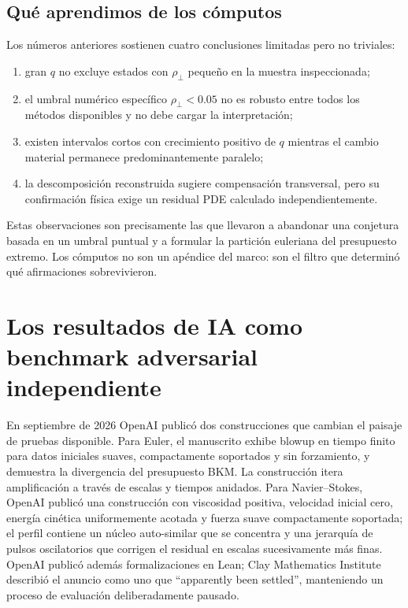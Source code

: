 \documentclass[11pt]{article}
\newcommand{\rhoT}{\rho_{\perp}}
\begin{document}
\subsection{Qué aprendimos de los cómputos}

Los números anteriores sostienen cuatro conclusiones limitadas pero no triviales:
\begin{enumerate}[leftmargin=1.7em]
\item gran $q$ no excluye estados con $\rhoT$ pequeño en la muestra inspeccionada;
\item el umbral numérico específico $\rhoT<0.05$ no es robusto entre todos los métodos disponibles y no debe cargar la interpretación;
\item existen intervalos cortos con crecimiento positivo de $q$ mientras el cambio material permanece predominantemente paralelo;
\item la descomposición reconstruida sugiere compensación transversal, pero su confirmación física exige un residual PDE calculado independientemente.
\end{enumerate}

Estas observaciones son precisamente las que llevaron a abandonar una conjetura basada en un umbral puntual y a formular la partición euleriana del presupuesto extremo. Los cómputos no son un apéndice del marco: son el filtro que determinó qué afirmaciones sobrevivieron.

\section{Los resultados de IA como benchmark adversarial independiente}

En septiembre de 2026 OpenAI publicó dos construcciones que cambian el paisaje de pruebas disponible. Para Euler, el manuscrito exhibe blowup en tiempo finito para datos iniciales suaves, compactamente soportados y sin forzamiento, y demuestra la divergencia del presupuesto BKM. La construcción itera amplificación a través de escalas y tiempos anidados. Para Navier--Stokes, OpenAI publicó una construcción con viscosidad positiva, velocidad inicial cero, energía cinética uniformemente acotada y fuerza suave compactamente soportada; el perfil contiene un núcleo auto-similar que se concentra y una jerarquía de pulsos oscilatorios que corrigen el residual en escalas sucesivamente más finas. OpenAI publicó además formalizaciones en Lean; Clay Mathematics Institute describió el anuncio como uno que ``apparently been settled'', manteniendo un proceso de evaluación deliberadamente pausado.
\end{document}
